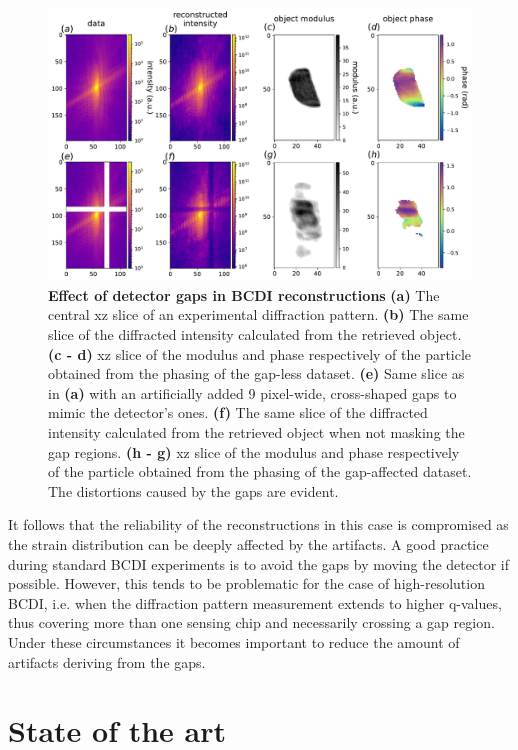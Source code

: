 \begin{figure}[h]
    \includegraphics[width=\textwidth]{figures/Inpainting/gaps_intropdf.pdf}
    \caption{\textbf{Effect of detector gaps in BCDI reconstructions} 
    \textbf{(a)} The central xz slice of an experimental diffraction pattern. \textbf{(b)} The same slice of the diffracted
    intensity calculated from the retrieved object. \textbf{(c - d)} xz slice of the modulus and phase respectively of the particle
    obtained from the phasing of the gap-less dataset. \textbf{(e)} Same slice as in \textbf{(a)} with an artificially added
    9 pixel-wide, cross-shaped gaps to mimic the detector's ones. \textbf{(f)} The same slice of the diffracted
    intensity calculated from the retrieved object when not masking the gap regions. \textbf{(h - g)} xz slice of the modulus and phase respectively of the particle
    obtained from the phasing of the gap-affected dataset. The distortions caused by the gaps are evident. }
    \label{fig:gap_intro}
    \end{figure}


It follows that the reliability of the reconstructions in this case is 
compromised as the strain distribution can be deeply affected by the artifacts. A good practice during standard BCDI experiments
is to avoid the gaps by moving the detector if possible. However, this tends to be problematic for the case of high-resolution BCDI, 
i.e. when the diffraction pattern measurement extends to higher q-values, thus covering more than one sensing 
chip and necessarily crossing a gap region. Under these circumstances it becomes important to reduce the amount of
artifacts deriving from the gaps. 


\section{State of the art}\label{sec:InpStateArt}

